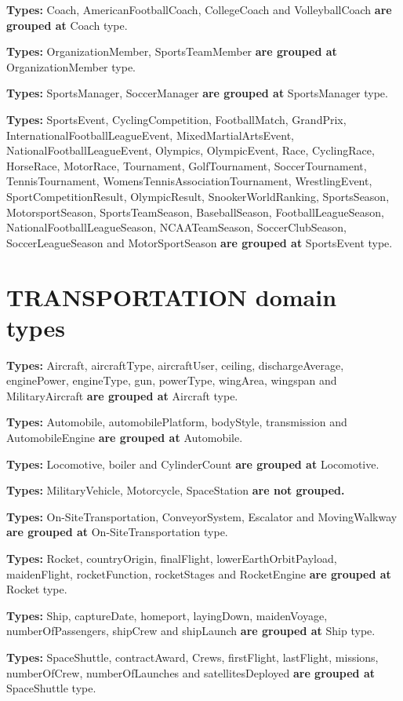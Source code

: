 \documentclass[thesis=M,english]{FITthesis}[2018/05/30]
\begin{document}
\textbf{Types:} Coach, AmericanFootballCoach, CollegeCoach and VolleyballCoach \textbf{are grouped at} Coach type.

\textbf{Types:} OrganizationMember, SportsTeamMember \textbf{are grouped at} OrganizationMember type.

\textbf{Types:} SportsManager, SoccerManager \textbf{are grouped at} SportsManager type.

\textbf{Types:} SportsEvent, CyclingCompetition, FootballMatch, GrandPrix, InternationalFootballLeagueEvent, MixedMartialArtsEvent, NationalFootballLeagueEvent, Olympics, OlympicEvent, Race, CyclingRace, HorseRace, MotorRace, Tournament, GolfTournament, SoccerTournament, TennisTournament, WomensTennisAssociationTournament, WrestlingEvent, SportCompetitionResult, OlympicResult, SnookerWorldRanking, SportsSeason, MotorsportSeason, SportsTeamSeason, BaseballSeason, FootballLeagueSeason, NationalFootballLeagueSeason, NCAATeamSeason, SoccerClubSeason, SoccerLeagueSeason and MotorSportSeason \textbf{are grouped at} SportsEvent type. 

\section{TRANSPORTATION domain types}\label{TransportationTypes}
\textbf{Types:} Aircraft, aircraftType, aircraftUser, ceiling, dischargeAverage, enginePower, engineType, gun, powerType, wingArea, wingspan and MilitaryAircraft \textbf{are grouped at } Aircraft type.

\textbf{Types:} Automobile, automobilePlatform, bodyStyle, transmission and AutomobileEngine \textbf{are grouped at } Automobile.

\textbf{Types:} Locomotive, boiler and CylinderCount \textbf{are grouped at} Locomotive.

\textbf{Types:} MilitaryVehicle, Motorcycle, SpaceStation \textbf{are not grouped.}

\textbf{Types:} On-SiteTransportation, ConveyorSystem, Escalator and MovingWalkway \textbf{are grouped at} On-SiteTransportation type.

\textbf{Types:} Rocket, countryOrigin, finalFlight, lowerEarthOrbitPayload, maidenFlight, rocketFunction, rocketStages and RocketEngine \textbf{are grouped at} Rocket type.

\textbf{Types:} Ship, captureDate, homeport, layingDown, maidenVoyage, numberOfPassengers, shipCrew and shipLaunch \textbf{are grouped at} Ship type.

\textbf{Types:} SpaceShuttle, contractAward, Crews, firstFlight, lastFlight, missions, numberOfCrew, numberOfLaunches and satellitesDeployed \textbf{are grouped at} SpaceShuttle type.
\end{document}
